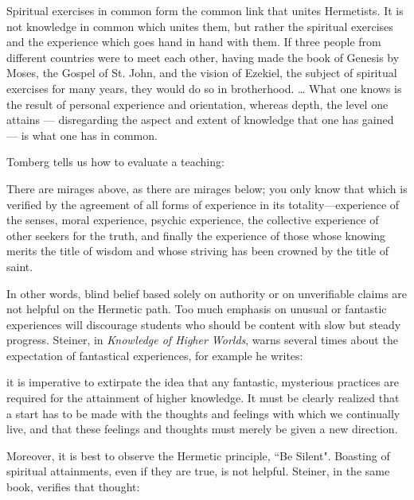 \begin{quotex}
Spiritual exercises in common form the common link that unites Hermetists. It is not knowledge in common which unites them, but rather the spiritual exercises and the experience which goes hand in hand with them. If three people from different countries were to meet each other, having made the book of Genesis by Moses, the Gospel of St. John, and the vision of Ezekiel, the subject of spiritual exercises for many years, they would do so in brotherhood. … What one knows is the result of personal experience and orientation, whereas depth, the level one attains — disregarding the aspect and extent of knowledge that one has gained — is what one has in common. 

\end{quotex}
Tomberg tells us how to evaluate a teaching:

\begin{quotex}
There are mirages above, as there are mirages below; you only know that which is verified by the agreement of all forms of experience in its totality—experience of the senses, moral experience, psychic experience, the collective experience of other seekers for the truth, and finally the experience of those whose knowing merits the title of wisdom and whose striving has been crowned by the title of saint. 

\end{quotex}
In other words, blind belief based solely on authority or on unverifiable claims are not helpful on the Hermetic path. Too much emphasis on unusual or fantastic experiences will discourage students who should be content with slow but steady progress. Steiner, in \emph{Knowledge of Higher Worlds}, warns several times about the expectation of fantastical experiences, for example he writes:

\begin{quotex}
it is imperative to extirpate the idea that any fantastic, mysterious practices are required for the attainment of higher knowledge. It must be clearly realized that a start has to be made with the thoughts and feelings with which we continually live, and that these feelings and thoughts must merely be given a new direction. 

\end{quotex}
Moreover, it is best to observe the Hermetic principle, ``Be Silent". Boasting of spiritual attainments, even if they are true, is not helpful. Steiner, in the same book, verifies that thought:

